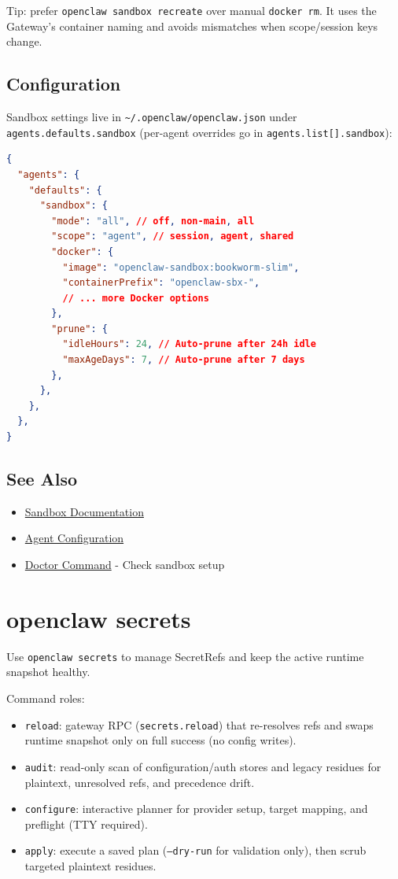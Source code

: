 Tip: prefer \texttt{openclaw sandbox recreate} over manual \texttt{docker rm}. It uses the
Gateway’s container naming and avoids mismatches when scope/session keys change.

\subsection{Configuration}


Sandbox settings live in \texttt{\textasciitilde{}/.openclaw/openclaw.json} under \texttt{agents.defaults.sandbox} (per-agent overrides go in \texttt{agents.list[].sandbox}):

\begin{lstlisting}[language=json]
{
  "agents": {
    "defaults": {
      "sandbox": {
        "mode": "all", // off, non-main, all
        "scope": "agent", // session, agent, shared
        "docker": {
          "image": "openclaw-sandbox:bookworm-slim",
          "containerPrefix": "openclaw-sbx-",
          // ... more Docker options
        },
        "prune": {
          "idleHours": 24, // Auto-prune after 24h idle
          "maxAgeDays": 7, // Auto-prune after 7 days
        },
      },
    },
  },
}
\end{lstlisting}


\subsection{See Also}


\begin{itemize}
  \item \href{/gateway/sandboxing}{Sandbox Documentation}
  \item \href{/concepts/agent-workspace}{Agent Configuration}
  \item \href{/gateway/doctor}{Doctor Command} - Check sandbox setup
\end{itemize}



\clearpage

\section{openclaw secrets}


Use \texttt{openclaw secrets} to manage SecretRefs and keep the active runtime snapshot healthy.

Command roles:

\begin{itemize}
  \item \texttt{reload}: gateway RPC (\texttt{secrets.reload}) that re-resolves refs and swaps runtime snapshot only on full success (no config writes).
  \item \texttt{audit}: read-only scan of configuration/auth stores and legacy residues for plaintext, unresolved refs, and precedence drift.
  \item \texttt{configure}: interactive planner for provider setup, target mapping, and preflight (TTY required).
  \item \texttt{apply}: execute a saved plan (\texttt{--dry-run} for validation only), then scrub targeted plaintext residues.
\end{itemize}


